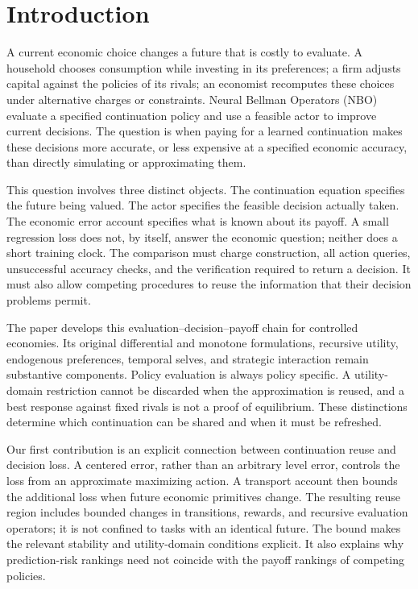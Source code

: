 \section{Introduction}\label{sec:introduction}
A current economic choice changes a future that is costly to evaluate. A
household chooses consumption while investing in its preferences; a firm
adjusts capital against the policies of its rivals; an economist recomputes
these choices under alternative charges or constraints. Neural Bellman
Operators (NBO) evaluate a specified continuation policy and use a feasible
actor to improve current decisions. The question is when paying for a learned
continuation makes these decisions more accurate, or less expensive at a
specified economic accuracy, than directly simulating or approximating them.

This question involves three distinct objects. The continuation equation
specifies the future being valued. The actor specifies the feasible decision
actually taken. The economic error account specifies what is known about its
payoff. A small regression loss does not, by itself, answer the economic
question; neither does a short training clock. The comparison must charge
construction, all action queries, unsuccessful accuracy checks, and the
verification required to return a decision. It must also allow competing
procedures to reuse the information that their decision problems permit.

The paper develops this evaluation--decision--payoff chain for controlled
economies. Its original differential and monotone formulations, recursive
utility, endogenous preferences, temporal selves, and strategic interaction
remain substantive components. Policy evaluation is always policy specific.
A utility-domain restriction cannot be discarded when the approximation is
reused, and a best response against fixed rivals is not a proof of equilibrium.
These distinctions determine which continuation can be shared and when it
must be refreshed.

Our first contribution is an explicit connection between continuation reuse
and decision loss. A centered error, rather than an arbitrary level error,
controls the loss from an approximate maximizing action. A transport account
then bounds the additional loss when future economic primitives change.
The resulting reuse region includes bounded changes in transitions, rewards,
and recursive evaluation operators; it is not confined to tasks with an
identical future. The bound makes the relevant stability and utility-domain
conditions explicit. It also explains why prediction-risk rankings need not
coincide with the payoff rankings of competing policies.

